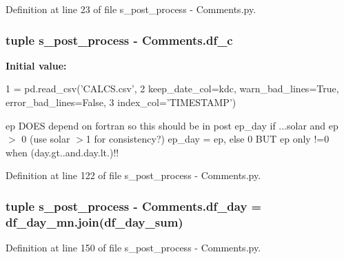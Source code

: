 Definition at line 23 of file s\+\_\+post\+\_\+process -\/ Comments.\+py.

\hypertarget{namespaces__post__process_01-_01_comments_a816aaeb2a13f356b17e012a7e77253a7}{}
\subsubsection[{df\+\_\+c}]{\setlength{\rightskip}{0pt plus 5cm}tuple s\+\_\+post\+\_\+process -\/ Comments.\+df\+\_\+c}\label{namespaces__post__process_01-_01_comments_a816aaeb2a13f356b17e012a7e77253a7}
{\bfseries Initial value\+:}
\begin{DoxyCode}
1 = pd.read\_csv(\textcolor{stringliteral}{'CALCS.csv'},
2                        keep\_date\_col=kdc, warn\_bad\_lines=\textcolor{keyword}{True}, error\_bad\_lines=\textcolor{keyword}{False},
3                        index\_col=\textcolor{stringliteral}{'TIMESTAMP'})
\end{DoxyCode}


ep D\+O\+E\+S depend on fortran so this should be in post ep\+\_\+day if ...solar and ep $>$ 0 (use solar $>$1 for consistency?) ep\+\_\+day = ep, else 0 B\+U\+T ep only !=0 when (day.\+gt..\+and.\+day.\+lt.)!! 



Definition at line 122 of file s\+\_\+post\+\_\+process -\/ Comments.\+py.

\hypertarget{namespaces__post__process_01-_01_comments_a6b0f3b1ea6c915417d9095c71f6a6d37}{}
\subsubsection[{df\+\_\+day}]{\setlength{\rightskip}{0pt plus 5cm}tuple s\+\_\+post\+\_\+process -\/ Comments.\+df\+\_\+day = df\+\_\+day\+\_\+mn.\+join({\bf df\+\_\+day\+\_\+sum})}\label{namespaces__post__process_01-_01_comments_a6b0f3b1ea6c915417d9095c71f6a6d37}


Definition at line 150 of file s\+\_\+post\+\_\+process -\/ Comments.\+py.

\hypertarget{namespaces__post__process_01-_01_comments_a1b2d87778a264a8cbd089338b879c0ad}{}
